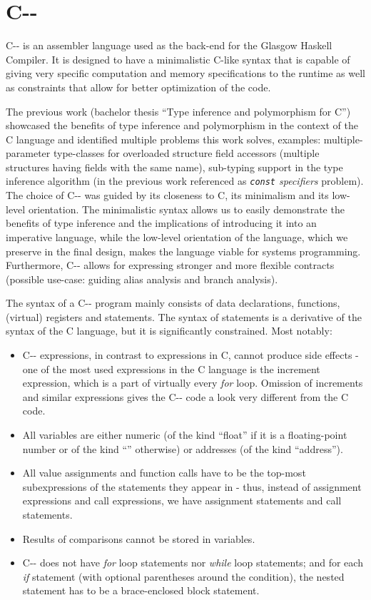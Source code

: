 \documentclass[12pt,a4paper]{article}
\begin{document}
\section{C-{}-}

C-{}- is an assembler language used as the back-end for the Glasgow Haskell Compiler. It is designed to have a minimalistic C-like syntax that is capable of giving very specific computation and memory specifications to the runtime as well as constraints that allow for better optimization of the code.

The previous work (bachelor thesis ``Type inference and polymorphism for C'') showcased the benefits of type inference and polymorphism in the context of the C language and identified multiple problems this work solves, examples: multiple-parameter type-classes for overloaded structure field accessors (multiple structures having fields with the same name), sub-typing support in the type inference algorithm (in the previous work referenced as \emph{\lstinline{const} specifiers} problem). The choice of C-{}- was guided by its closeness to C, its minimalism and its low-level orientation. The minimalistic syntax allows us to easily demonstrate the benefits of type inference and the implications of introducing it into an imperative language, while the low-level orientation of the language, which we preserve in the final design, makes the language viable for systems programming. Furthermore, C-{}- allows for expressing stronger and more flexible contracts (possible use-case: guiding alias analysis and branch analysis).

The syntax of a C-{}- program mainly consists of data declarations, functions, (virtual) registers and statements. The syntax of statements is a derivative of the syntax of the C language, but it is significantly constrained. Most notably:

\begin{itemize}
	\item C-{}- expressions, in contrast to expressions in C, cannot produce side effects - one of the most used expressions in the C language is the increment expression, which is a part of virtually every \textit{for} loop. Omission of increments and similar expressions gives the C-{}- code a look very different from the C code.
	\item All variables are either numeric (of the kind ``float'' if it is a floating-point number or of the kind ``'' otherwise) or addresses (of the kind ``address'').
	\item All value assignments and function calls have to be the top-most subexpressions of the statements they appear in - thus, instead of assignment expressions and call expressions, we have assignment statements and call statements.
	\item Results of comparisons cannot be stored in variables.
	\item C-{}- does not have \textit{for} loop statements nor \textit{while} loop statements; and for each \textit{if} statement (with optional parentheses around the condition), the nested statement has to be a brace-enclosed block statement.
\end{itemize}
\end{document}
